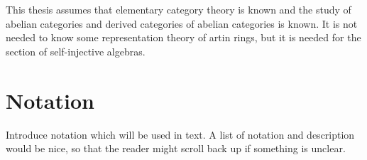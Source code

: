     This thesis assumes that elementary category theory is known and the study of abelian categories and derived categories of abelian categories is known. It is not needed to know some representation theory of artin rings, but it is needed for the section of self-injective algebras.
        
    \section*{Notation}
        Introduce notation which will be used in text. A list of notation and description would be nice, so that the reader might scroll back up if something is unclear.

